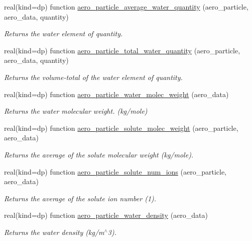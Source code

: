\begin{DoxyCompactItemize}
real(kind=dp) function \mbox{\hyperlink{namespacepmc__aero__particle_aecc8efd7dd11b637428dd173d847366c}{aero\+\_\+particle\+\_\+average\+\_\+water\+\_\+quantity}} (aero\+\_\+particle, aero\+\_\+data, quantity)
\begin{DoxyCompactList}\small\item\em Returns the water element of quantity. \end{DoxyCompactList}\item 
real(kind=dp) function \mbox{\hyperlink{namespacepmc__aero__particle_a472b1a90315a18d963f8f2f57bbc94fc}{aero\+\_\+particle\+\_\+total\+\_\+water\+\_\+quantity}} (aero\+\_\+particle, aero\+\_\+data, quantity)
\begin{DoxyCompactList}\small\item\em Returns the volume-\/total of the water element of quantity. \end{DoxyCompactList}\item 
real(kind=dp) function \mbox{\hyperlink{namespacepmc__aero__particle_a223d96eb6697ad6f4cd2b16074d0c9cf}{aero\+\_\+particle\+\_\+water\+\_\+molec\+\_\+weight}} (aero\+\_\+data)
\begin{DoxyCompactList}\small\item\em Returns the water molecular weight. (kg/mole) \end{DoxyCompactList}\item 
real(kind=dp) function \mbox{\hyperlink{namespacepmc__aero__particle_a8a9fb61df2366ea2e6e29ff3ed66ad04}{aero\+\_\+particle\+\_\+solute\+\_\+molec\+\_\+weight}} (aero\+\_\+particle, aero\+\_\+data)
\begin{DoxyCompactList}\small\item\em Returns the average of the solute molecular weight (kg/mole). \end{DoxyCompactList}\item 
real(kind=dp) function \mbox{\hyperlink{namespacepmc__aero__particle_a2dd738f45ba93c98a48e63b4486ae752}{aero\+\_\+particle\+\_\+solute\+\_\+num\+\_\+ions}} (aero\+\_\+particle, aero\+\_\+data)
\begin{DoxyCompactList}\small\item\em Returns the average of the solute ion number (1). \end{DoxyCompactList}\item 
real(kind=dp) function \mbox{\hyperlink{namespacepmc__aero__particle_acb938c761ee8d337f085cce45cc64ca6}{aero\+\_\+particle\+\_\+water\+\_\+density}} (aero\+\_\+data)
\begin{DoxyCompactList}\small\item\em Returns the water density (kg/m$^\wedge$3). \end{DoxyCompactList}\item 

\end{DoxyCompactItemize}
